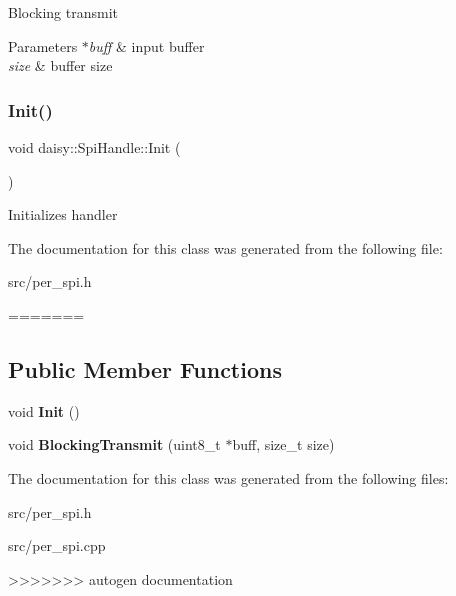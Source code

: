 Blocking transmit 
\begin{DoxyParams}{Parameters}
{\em $\ast$buff} & input buffer \\
\hline
{\em size} & buffer size \\
\hline
\end{DoxyParams}
\mbox{\label{classdaisy_1_1_spi_handle_a567b2e40b20e11acfc3c1029ca9777bf}} 
\subsubsection{\texorpdfstring{Init()}{Init()}}
{\footnotesize\ttfamily void daisy\+::\+Spi\+Handle\+::\+Init (\begin{DoxyParamCaption}{ }\end{DoxyParamCaption})}

Initializes handler 

The documentation for this class was generated from the following file\+:\begin{DoxyCompactItemize}
\item 
src/per\+\_\+spi.\+h\end{DoxyCompactItemize}
=======
\subsection*{Public Member Functions}
\begin{DoxyCompactItemize}
\item 
\mbox{\label{classdaisy_1_1_spi_handle_a0ea5ce174d8db42497feb1d272d7c1d2}} 
void {\bfseries Init} ()
\item 
\mbox{\label{classdaisy_1_1_spi_handle_aa374ce1cb6bb9950d1d60e239a0b8559}} 
void {\bfseries Blocking\+Transmit} (uint8\+\_\+t $\ast$buff, size\+\_\+t size)
\end{DoxyCompactItemize}


The documentation for this class was generated from the following files\+:\begin{DoxyCompactItemize}
\item 
src/per\+\_\+spi.\+h\item 
src/per\+\_\+spi.\+cpp\end{DoxyCompactItemize}
>>>>>>> autogen documentation

